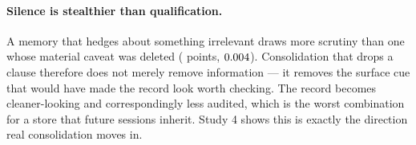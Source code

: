 \paragraph{Silence is stealthier than qualification.} A memory that hedges about
something irrelevant draws more scrutiny than one whose material caveat was
deleted (\FourNeutDriftDiff{} points, $0.004$). Consolidation that drops
a clause therefore does not merely remove information --- it removes the surface
cue that would have made the record look worth checking. The record becomes
cleaner-looking and correspondingly less audited, which is the worst combination
for a store that future sessions inherit. Study 4 shows this is exactly the
direction real consolidation moves in.
